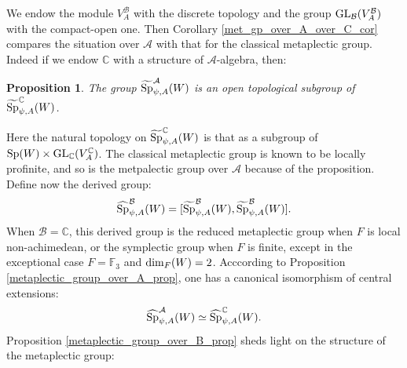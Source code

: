 \documentclass[11pt]{article}
\theoremstyle{plain}
\theoremstyle{definition}
\theoremstyle{plain}
\newtheorem*{prop_sans_num}{Proposition}
\theoremstyle{definition}
\theoremstyle{plain}
\begin{document}
We endow the module $V_A^\mathcal{B}$ with the discrete topology and the group $\textup{GL}_\mathcal{B}(V_A^\mathcal{B})$ with the compact-open one. Then Corollary \ref{met_gp_over_A_over_C_cor} compares the situation over $\mathcal{A}$ with that for the classical metaplectic group. Indeed if we endow $\mathbb{C}$ with a structure of $\mathcal{A}$-algebra, then:

\begin{prop_sans_num} The group $\widetilde{\textup{Sp}}_{\psi,A}^\mathcal{A}(W)$ is an open topological subgroup of $\widetilde{\textup{Sp}}_{\psi,A}^\mathbb{C}(W)$.  \end{prop_sans_num}

Here the natural topology on $\widetilde{\textup{Sp}}_{\psi,A}^\mathbb{C}(W)$ is that as a subgroup of $\textup{Sp}(W) \times \textup{GL}_\mathbb{C}(V_A^\mathbb{C})$. The classical metaplectic group is known to be locally profinite, and so is the metpalectic group over $\mathcal{A}$ because of the proposition. Define now the derived group:
$$\widehat{\textup{Sp}}_{\psi,A}^\mathcal{B}(W) =[\widetilde{\textup{Sp}}_{\psi,A}^\mathcal{B}(W),\widetilde{\textup{Sp}}_{\psi,A}^\mathcal{B}(W)].$$
When $\mathcal{B}=\mathbb{C}$, this derived group is the reduced metaplectic group when $F$ is local non-achimedean, or the symplectic group when $F$ is finite, except in the exceptional case $F=\mathbb{F}_3$ and $\textup{dim}_F(W) =2$. Acccording to Proposition \ref{metaplectic_group_over_A_prop}, one has a canonical isomorphism of central extensions:
$$\widehat{\textup{Sp}}_{\psi,A}^\mathcal{A}(W) \simeq \widehat{\textup{Sp}}_{\psi,A}^\mathbb{C}(W).$$
Proposition \ref{metaplectic_group_over_B_prop} sheds light on the structure of the metaplectic group:
\end{document}
